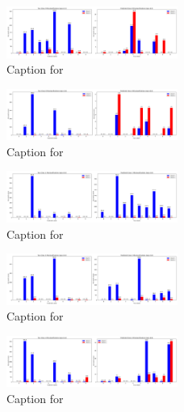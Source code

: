 \documentclass[12pt, a4paper]{article}
\begin{document}
\begin{figure}[ht]
\centering
\includegraphics[width=0.5\textwidth]{combined_class_boundary_pgd/combined_class_9_misclassifications_eps_0.5.png}
\caption{Caption for }
\label{fig:combined_class_9_misclassifications_eps_0.5.png}
\end{figure}

\begin{figure}[ht]
\centering
\includegraphics[width=0.5\textwidth]{combined_class_boundary_pgd/combined_class_0_misclassifications_eps_0.6.png}
\caption{Caption for }
\label{fig:combined_class_0_misclassifications_eps_0.6.png}
\end{figure}

\begin{figure}[ht]
\centering
\includegraphics[width=0.5\textwidth]{combined_class_boundary_pgd/combined_class_1_misclassifications_eps_0.6.png}
\caption{Caption for }
\label{fig:combined_class_1_misclassifications_eps_0.6.png}
\end{figure}

\begin{figure}[ht]
\centering
\includegraphics[width=0.5\textwidth]{combined_class_boundary_pgd/combined_class_3_misclassifications_eps_0.6.png}
\caption{Caption for }
\label{fig:combined_class_3_misclassifications_eps_0.6.png}
\end{figure}

\begin{figure}[ht]
\centering
\includegraphics[width=0.5\textwidth]{combined_class_boundary_pgd/combined_class_4_misclassifications_eps_0.6.png}
\caption{Caption for }
\label{fig:combined_class_4_misclassifications_eps_0.6.png}
\end{figure}
\end{document}
